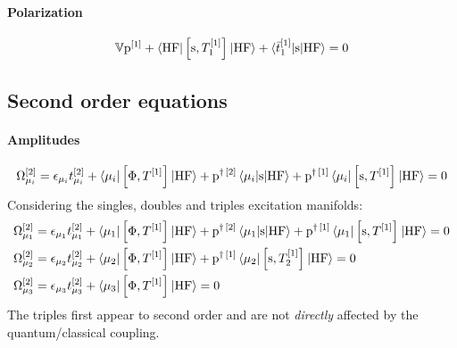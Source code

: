 \paragraph*{Polarization}
  \begin{equation}\label{eq:1st-order-pol}
    \mathbb{V}\mathrm{p}^{[1]} + \braket{\mathrm{HF} | \left[ \mathrm{s}, T_1^{[1]} \right]^{}| \mathrm{HF}}
    + \braket{\bar{t}_{1}^{[1]} | \mathrm{s} | \mathrm{HF} } = 0
  \end{equation}

\subsection{Second order equations}\label{sec:second-order-pt}

\paragraph*{Amplitudes}
\begin{equation}\label{eq:2nd-order-amp}
  \Omega_{\mu_i}^{[2]} = \epsilon_{\mu_i}t_{\mu_i}^{[2]}
  + \braket{\mu_i | \left[ \Phi, T^{[1]} \right]^{} | \mathrm{HF}}
  + \mathrm{p}^{\dagger\,[2]}\braket{\mu_i | \mathrm{s} | \mathrm{HF}}
  + \mathrm{p}^{\dagger\,[1]}\braket{\mu_i | \left[ \mathrm{s}, T^{[1]} \right]^{} |
  \mathrm{HF}}
  = 0
\end{equation}
Considering the singles, doubles and triples excitation manifolds:
\begin{subequations}
  \begin{align}
  \Omega_{\mu_1}^{[2]} &= \epsilon_{\mu_1}t_{\mu_1}^{[2]}
  + \braket{\mu_1 | \left[ \Phi, T^{[1]} \right]^{} | \mathrm{HF}}
  + \mathrm{p}^{\dagger\,[2]}\braket{\mu_1 | \mathrm{s} | \mathrm{HF}}
  + \mathrm{p}^{\dagger\,[1]}\braket{\mu_1 | \left[ \mathrm{s}, T^{[1]} \right]^{} |
  \mathrm{HF}}
  = 0 \\
  \Omega_{\mu_2}^{[2]} &= \epsilon_{\mu_2}t_{\mu_2}^{[2]}
  + \braket{\mu_2 | \left[ \Phi, T^{[1]} \right]^{} | \mathrm{HF}}
  + \mathrm{p}^{\dagger\,[1]}\braket{\mu_2 | \left[ \mathrm{s}, T_2^{[1]} \right]^{} |
  \mathrm{HF}}
  = 0 \\
  \Omega_{\mu_3}^{[2]} &= \epsilon_{\mu_3}t_{\mu_3}^{[2]}
  + \braket{\mu_3 | \left[ \Phi, T^{[1]} \right]^{} | \mathrm{HF}}
  = 0
  \end{align}
\end{subequations}
The triples first appear to second order and are not \emph{directly}
affected by the quantum/classical coupling.
